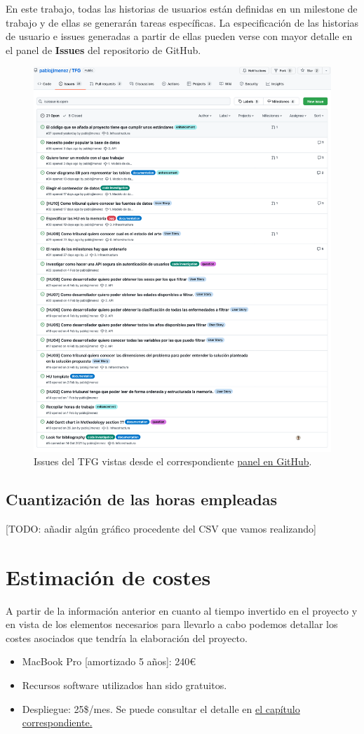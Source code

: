 En este trabajo, todas las historias de usuarios están definidas en un milestone
de trabajo y de ellas se generarán tareas específicas. La especificación de las historias de usuario e issues generadas a partir de ellas
pueden verse con mayor detalle en el panel de \textbf{Issues} del repositorio de GitHub.
\begin{figure}[]
	\centering
	\includegraphics[scale=0.3]{doc/logos/imgs/issues.png}
	\caption{ Issues del TFG vistas desde el correspondiente \href{https://github.com/pablojjimenez/TFG/issues}{panel en GitHub}. }
    \label{fig:worst_f_value}
\end{figure}

\subsection{Cuantización de las horas empleadas}
[TODO: añadir algún gráfico procedente del CSV que vamos realizando]

\section{Estimación de costes}
A partir de la información anterior en cuanto al tiempo invertido en el proyecto y en vista de los elementos necesarios
para llevarlo a cabo podemos detallar los costes asociados que tendría la elaboración del proyecto.

\begin{itemize}
    \item MacBook Pro [amortizado 5 años]: 240€
    \item Recursos software utilizados han sido gratuitos.
    \item Despliegue: 25\$/mes. Se puede consultar el detalle en \hyperref[sec:despliegue]{el capítulo correspondiente.}
\end{itemize}
